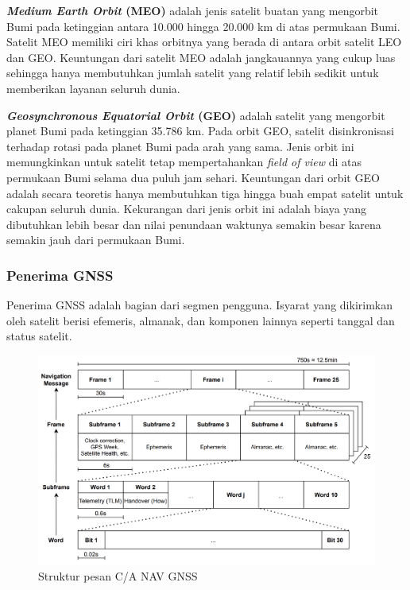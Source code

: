 \textbf{\textit{Medium Earth Orbit} (MEO)} adalah jenis satelit buatan yang mengorbit Bumi pada ketinggian antara 10.000 hingga 20.000 km di atas permukaan Bumi. Satelit MEO memiliki ciri khas orbitnya yang berada di antara orbit satelit LEO dan GEO. Keuntungan dari satelit MEO adalah jangkauannya yang cukup luas sehingga hanya membutuhkan jumlah satelit yang relatif lebih sedikit untuk memberikan layanan seluruh dunia.

\textbf{\textit{Geosynchronous Equatorial Orbit} (GEO)} adalah satelit yang mengorbit planet Bumi pada ketinggian 35.786 km. Pada orbit GEO, satelit disinkronisasi terhadap rotasi pada planet Bumi pada arah yang sama. Jenis orbit ini memungkinkan untuk satelit tetap mempertahankan \textit{field of view} di atas permukaan Bumi selama dua puluh jam sehari. Keuntungan dari orbit GEO adalah secara teoretis hanya membutuhkan tiga hingga buah empat satelit untuk cakupan seluruh dunia. Kekurangan dari jenis orbit ini adalah biaya yang dibutuhkan lebih besar dan nilai penundaan waktunya semakin besar karena semakin jauh dari permukaan Bumi.

\subsubsection{Penerima GNSS}
Penerima GNSS adalah bagian dari segmen pengguna. Isyarat yang dikirimkan oleh satelit berisi efemeris, almanak, dan komponen lainnya seperti tanggal dan status satelit.

\begin{figure}[H]
	\centering
	\includegraphics[width=13cm]{contents/chapter-2/gnss_msg_structure.png}
	\caption{Struktur pesan C/A NAV GNSS}
	\label{Fig: gnss_message_structure}
\end{figure}

